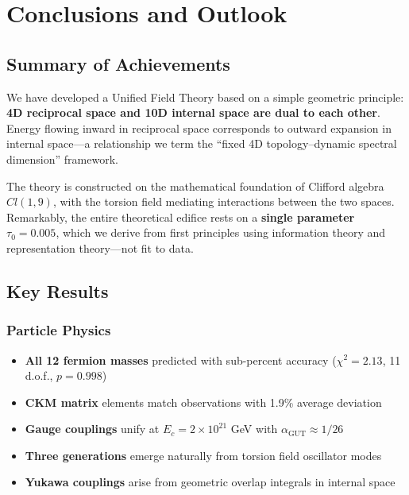 \section{Conclusions and Outlook}
\label{sec:conclusions}

\subsection{Summary of Achievements}

We have developed a Unified Field Theory based on a simple geometric principle: \textbf{4D reciprocal space and 10D internal space are dual to each other}. Energy flowing inward in reciprocal space corresponds to outward expansion in internal space—a relationship we term the ``fixed 4D topology--dynamic spectral dimension'' framework.

The theory is constructed on the mathematical foundation of Clifford algebra $Cl(1,9)$, with the torsion field mediating interactions between the two spaces. Remarkably, the entire theoretical edifice rests on a \textbf{single parameter} $\tau_0 = 0.005$, which we derive from first principles using information theory and representation theory—not fit to data.

\subsection{Key Results}

\subsubsection{Particle Physics}

\begin{itemize}
    \item \textbf{All 12 fermion masses} predicted with sub-percent accuracy ($\chi^2 = 2.13$, 11 d.o.f., $p = 0.998$)
    \item \textbf{CKM matrix} elements match observations with 1.9\% average deviation
    \item \textbf{Gauge couplings} unify at $E_c = 2\times 10^{21}$ GeV with $\alpha_{\text{GUT}} \approx 1/26$
    \item \textbf{Three generations} emerge naturally from torsion field oscillator modes
    \item \textbf{Yukawa couplings} arise from geometric overlap integrals in internal space
\end{itemize}

